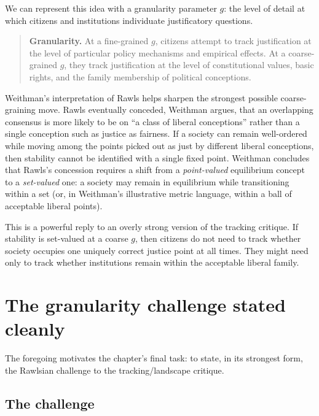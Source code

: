\documentclass[12pt]{report}
\begin{document}
We can represent this idea with a granularity parameter \(g\): the level of detail at which citizens and institutions individuate justificatory questions.

\begin{quote}
\textbf{Granularity.} At a fine-grained \(g\), citizens attempt to track justification at the level of particular policy mechanisms and empirical effects. At a coarse-grained \(g\), they track justification at the level of constitutional values, basic rights, and the family membership of political conceptions.
\end{quote}

Weithman’s interpretation of Rawls helps sharpen the strongest possible coarse-graining move. Rawls eventually conceded, Weithman argues, that an overlapping consensus is more likely to be on \enquote{a class of liberal conceptions} rather than a single conception such as justice as fairness.\parencite[p.~205]{Weithman2023FixedPoints} If a society can remain well-ordered while moving among the points picked out as just by different liberal conceptions, then stability cannot be identified with a single fixed point. Weithman concludes that Rawls’s concession requires a shift from a \emph{point-valued} equilibrium concept to a \emph{set-valued} one: a society may remain in equilibrium while transitioning within a set (or, in Weithman’s illustrative metric language, within a ball of acceptable liberal points).\parencite[pp.~205--206]{Weithman2023FixedPoints}

This is a powerful reply to an overly strong version of the tracking critique. If stability is set-valued at a coarse \(g\), then citizens do not need to track whether society occupies one uniquely correct justice point at all times. They might need only to track whether institutions remain within the acceptable liberal family.

\section{The granularity challenge stated cleanly}\label{sec:granularity-challenge}

The foregoing motivates the chapter’s final task: to state, in its strongest form, the Rawlsian challenge to the tracking/landscape critique.

\subsection{The challenge}
\end{document}
